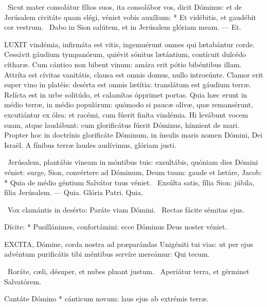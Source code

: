 \R\ Sicut mater consolátur fílios suos, ita consolábor vos, dicit Dóminus: et de Jerúsalem civitáte quam elégi, véniet vobis auxílium: * Et vidébitis, et gaudébit cor vestrum. \V\ Dabo in Sion salútem, et in Jerúsalem glóriam meam. --- Et.


\lettrine[lines=2]{L}{UXIT} vindémia, infirmáta est vitis, ingemuérunt omnes qui lætabántur corde. Cessávit gáudium tympanórum, quiévit sónitus lætántium, contícuit dulcédo cítharæ. Cum cántico non bibent vinum: amára erit pótio bibéntibus illam. Attríta est cívitas vanitátis, clausa est omnis domus, nullo introeúnte. Clamor erit super vino in platéis: desérta est omnis lætítia: translátum est gáudium terræ. Relícta est in urbe solitúdo, et calamítas ópprimet portas. Quia hæc erunt in médio terræ, in médio populórum: quómodo si paucæ olívæ, quæ remansérunt, excutiántur ex ólea: et racémi, cum fúerit finíta vindémia. Hi levábunt vocem suam, atque laudábunt: cum glorificátus fúerit Dóminus, hínnient de mari. Propter hoc in doctrínis glorificáte Dóminum, in ínsulis maris nomen Dómini, Dei Israël. A fínibus terræ laudes audívimus, glóriam justi.

\R\ Jerúsalem, plantábis víneam in móntibus tuis: exsultábis, quóniam dies Dómini véniet: surge, Sion, convértere ad Dóminum, Deum tuum: gaude et lætáre, Jacob: * Quia de médio géntium Salvátor tuus véniet. \V\ Exsúlta satis, fília Sion: júbila, fília Jerúsalem. --- Quia. Glória Patri. Quia.

\V\ Vox clamántis in desérto: Paráte viam Dómini. \R\ Rectas fácite sémitas ejus.

 Dícite: * Pusillánimes, confortámini: ecce Dóminus Deus noster véniet.


\lettrine[lines=2]{E}{XCITA}, Dómine, corda nostra ad præparándas Unigéniti tui vias: ut per ejus advéntum purificátis tibi méntibus servíre mereámur: Qui tecum.

\V\ Roráte, cæli, désuper, et nubes pluant justum. \R\ Aperiátur terra, et gérminet Salvatórem.

 Cantáte Dómino * cánticum novum: laus ejus ab extrémis terræ.

\sectionornament




